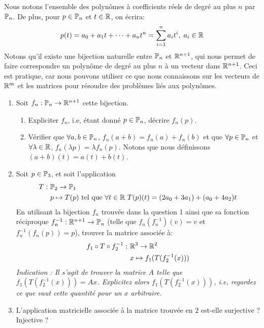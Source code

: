 \begin{exercice}
\noindent Nous notons l'ensemble des polynômes à coefficients réels de degré au plus $n$ par $\P_n$. De plus, pour $p \in \P_n$ et $t \in \R$, on écrira:
$$p(t) = a_0 + a_1 t + \cdots + a_n t^n = \sum_{i=1}^{n} a_i t^i, \; a_i \in \R$$
Notons qu'il existe une bijection naturelle entre $\P_n$ et $\R^{n+1}$, qui nous permet de faire correspondre un polynôme de degré au plus $n$ à un vecteur dans $\R^{n+1}$. Ceci est pratique, car nous pouvons utiliser ce que nous connaissons sur les vecteurs de $\R^m$ et les matrices pour résoudre des problèmes liés aux polynômes. 
\begin{enumerate}
    \item Soit $f_n: \P_n \to \R^{n+1}$ cette bijection.
    \begin{enumerate}
        \item Expliciter $f_n$, i.e, étant donné $p \in \P_n$, décrire $f_n(p)$.
        \item Vérifier que $\forall a, b \in \P_n$, $f_n(a + b) = f_n(a) + f_n(b)$ et que $\forall p \in \P_n$ et $\forall \lambda \in \R$, $f_n(\lambda p) = \lambda f_n(p)$. Notons que nous définissons $(a+b)(t) = a(t) + b(t)$.
    \end{enumerate}
    \item Soit $p \in \P_3$, et soit l'application
    \begin{align*}
        T: \ &\P_2 \to \P_1\\
        &p \mapsto T(p) \text{ tel que }\forall t \in \R \ T(p)(t) = (2a_0 + 3a_1) + (a_0 + 4a_2)t
    \end{align*}
    En utilisant la bijection $f_n$ trouvée dans la question 1 ainsi que sa fonction réciproque $f_n^{-1} : \R^{n+1} \to \P_n$ (telle que $f_n(f_n^{-1})(v) = v$ et $f_n^{-1}(f_n(p)) =p $), trouver la matrice associée à: 
    \begin{align*}
        f_1 \circ T \circ f_2^{-1}: \ &\R^3 \to \R^2\\
        &x \mapsto f_1(T(f_2^{-1}(x)))
    \end{align*}
    \textit{Indication : Il s'agit de trouver la matrice $A$ telle que $f_1(T(f_2^{-1}(x)))= Ax$. Explicitez alors $f_1(T(f_2^{-1}(x)))$, i.e, regardez ce que vaut cette quantité pour un $x$ arbitraire.}
    \item L'application matricielle associée à la matrice trouvée en $2$ est-elle surjective ? Injective ?\\
    
\end{enumerate}
\end{exercice}